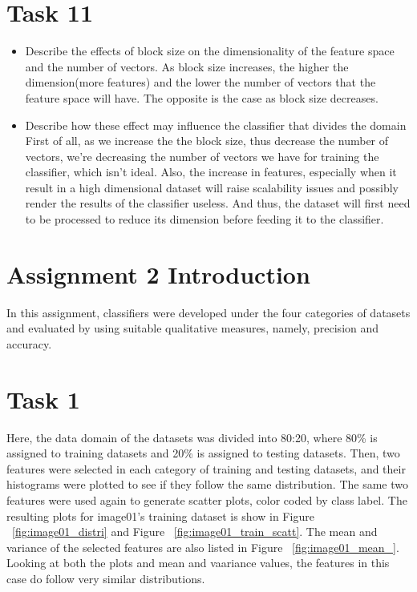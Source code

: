 \documentclass[sigconf]{acmart}
\begin{document}
\section{Task 11}
\begin{itemize}
    \item Describe the effects of block size on the dimensionality of the feature space and the number of vectors.
    As block size increases, the higher the dimension(more features) and the lower the number of vectors that the feature space will have. The opposite is the case as block size decreases.
    \item Describe how these effect may influence the classifier that divides the domain
    First of all, as we increase the the block size, thus decrease the number of vectors, we're decreasing the number of vectors we have for training the classifier, which isn't ideal. Also, the increase in features, especially when it result in a high dimensional dataset will raise scalability issues and possibly render the results of the classifier useless. And thus, the dataset will first need to be processed to reduce its dimension before feeding it to the classifier.
\end{itemize}

\section{Assignment 2 Introduction}
 In this assignment, classifiers were developed under the four categories of datasets and
evaluated by using suitable qualitative measures, namely, precision and accuracy.

\section{Task 1}
Here, the data domain of the datasets was divided into 80:20, where 80\% is assigned to training datasets and 20\% is assigned to testing datasets. 
Then, two features were selected in each category of training and testing datasets, and their histograms were plotted to see if they follow the same distribution. The same two features were used again to generate scatter plots, color coded by class label. 
The resulting plots for image01's training dataset is show in Figure ~\ref{fig:image01_distri} and Figure ~\ref{fig:image01_train_scatt}.
The mean and variance of the selected features are also listed in Figure ~\ref{fig:image01_mean_}. Looking at both the plots and mean and vaariance values, the features in this case do follow very similar distributions.
\end{document}
